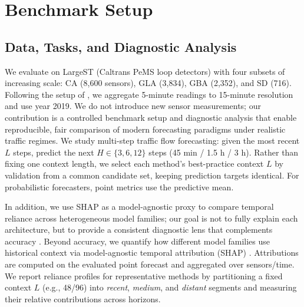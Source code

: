 \documentclass[10pt]{article}
\begin{document}



\section{Benchmark Setup}
\label{sec:setup}

\subsection{Data, Tasks, and Diagnostic Analysis}
We evaluate on {LargeST} (Caltrans PeMS loop detectors) \citep{liu2023largest} with four subsets of increasing
scale: CA (8,600 sensors), GLA (3,834), GBA (2,352), and SD (716). Following the setup of \citet{liu2023largest},
we aggregate 5-minute readings to 15-minute resolution and use year 2019. We do not introduce new sensor measurements; our contribution is a controlled benchmark setup and
diagnostic analysis that enable reproducible, fair comparison of modern forecasting paradigms under realistic
traffic regimes.
We study multi-step traffic flow forecasting: given the most recent $L$ steps, predict the next
$H \in \{3,6,12\}$ steps (45 min / 1.5 h / 3 h). 
Rather than fixing one context length, we select each method's best-practice
context $L$ by validation from a common candidate set, keeping prediction targets identical. For probabilistic
forecasters, point metrics use the predictive mean. 

In addition, we use SHAP as a model-agnostic proxy to compare temporal reliance across heterogeneous model families; our goal is
not to fully explain each architecture, but to provide a consistent diagnostic lens that complements accuracy \citep{lundberg2017shap}. Beyond accuracy, we quantify how different model families use historical context via model-agnostic temporal
attribution (SHAP) \citep{lundberg2017shap}.  Attributions are computed on the evaluated point forecast and aggregated over
sensors/time. We report reliance profiles for representative methods by partitioning a fixed context $L$ (e.g., 48/96) into \textit{recent}, \textit{medium}, and
\textit{distant} segments and measuring their relative contributions across horizons.%
\end{document}
